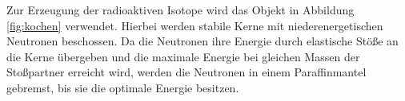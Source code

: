 Zur Erzeugung der radioaktiven Isotope wird das Objekt in Abbildung \ref{fig:kochen} verwendet.
Hierbei werden stabile Kerne mit niederenergetischen Neutronen beschossen.
Da die Neutronen ihre Energie durch elastische Stöße an die Kerne übergeben und die maximale
Energie bei gleichen Massen der Stoßpartner erreicht wird, werden die Neutronen in einem
Paraffinmantel gebremst, bis sie die optimale Energie besitzen.
